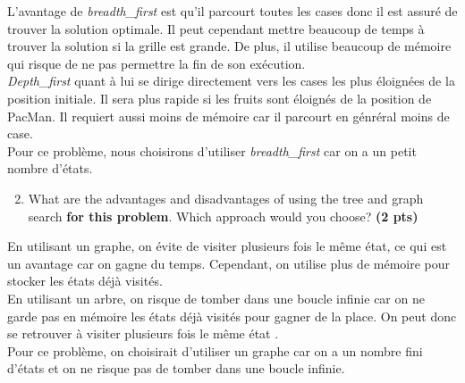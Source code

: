 \documentclass[11pt,a4paper]{../template/report}
\begin{document}
\begin{answer}
L'avantage de \textit{breadth\_first} est qu'il parcourt toutes les cases donc il est assuré de trouver la solution optimale. Il peut cependant mettre beaucoup de temps à trouver la solution si la grille est grande. De plus, il utilise beaucoup de mémoire qui risque de ne pas permettre la fin de son exécution. \\
\textit{Depth\_first} quant à lui se dirige directement vers les cases les plus éloignées de la position initiale. Il sera plus rapide si les fruits sont éloignés de la position de PacMan. Il requiert aussi moins de mémoire car il parcourt en génréral moins de case. \\
Pour ce problème, nous choisirons d'utiliser \textit{breadth\_first} car on a un petit nombre d'états.
\end{answer}



\begin{enumerate}
\setcounter{enumi}{1}
\begin{enumerate}
\setcounter{enumii}{1}
    \item What are the advantages and disadvantages of using the tree and graph search \textbf{for this problem}. Which approach would you choose? \textbf{(2 pts)}
\end{enumerate}
\end{enumerate}

\begin{answers}[4cm]
En utilisant un graphe, on évite de visiter plusieurs fois le même état, ce qui est un avantage car on gagne du temps. Cependant, on utilise plus de mémoire pour stocker les états déjà visités. \\
En utilisant un arbre, on risque de tomber dans une boucle infinie car on ne garde pas en mémoire les états déjà visités pour gagner de la place. On peut donc se retrouver à visiter plusieurs fois le même état . \\
Pour ce problème, on choisirait d'utiliser un graphe car on a un nombre fini d'états et on ne risque pas de tomber dans une boucle infinie.
\end{answers}
\end{document}
